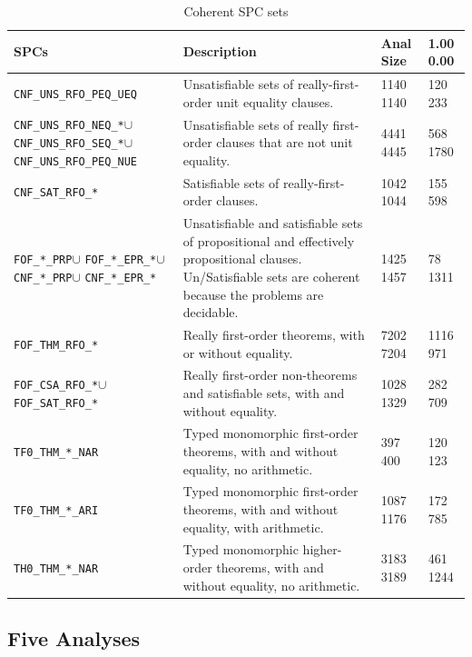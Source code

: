 \documentclass[runningheads]{llncs}
\begin{document}
\begin{table}[h!]
\renewcommand{\arraystretch}{1.5}
\center
\begin{tabular}{p{3.5cm}|p{6.5cm}|R{0.7cm}R{0.7cm}}
\hline
SPCs & Description & Anal Size & 1.00 0.00 \\
\hline
{\tt CNF\_UNS\_RFO\_PEQ\_UEQ} &
Unsatisfiable sets of really-first-order unit equality clauses.
& 1140 1140 & 120 233 \\
{\tt CNF\_UNS\_RFO\_NEQ\_*}\enspace$\cup$ {\tt CNF\_UNS\_RFO\_SEQ\_*}\enspace$\cup$
{\tt CNF\_UNS\_RFO\_PEQ\_NUE} &
Unsatisfiable sets of really first-order clauses that are not unit equality.
& 4441 4445 & 568 1780 \\
{\tt CNF\_SAT\_RFO\_*} &
Satisfiable sets of really-first-order clauses.
& 1042 1044 & 155 598 \\
{\tt FOF\_*\_PRP}\enspace$\cup$ {\tt FOF\_*\_EPR\_*}\enspace$\cup$
{\tt CNF\_*\_PRP}\enspace$\cup$ {\tt CNF\_*\_EPR\_*} &
Unsatisfiable and satisfiable sets of propositional and effectively propositional clauses.
Un/Satisfiable sets are coherent because the problems are decidable.
& 1425 1457 & 78 1311 \\
{\tt FOF\_THM\_RFO\_*} &
Really first-order theorems, with or without equality.
& 7202 7204 & 1116 971 \\
{\tt FOF\_CSA\_RFO\_*}\enspace$\cup$ {\tt FOF\_SAT\_RFO\_*} &
Really first-order non-theorems and satisfiable sets, with and without equality.
& 1028 1329 & 282 709 \\
{\tt TF0\_THM\_*\_NAR} &
Typed monomorphic first-order theorems, with and without equality, no arithmetic.
& 397 400 & 120 123 \\
{\tt TF0\_THM\_*\_ARI} &
Typed monomorphic first-order theorems, with and without equality, with arithmetic.
& 1087 1176 & 172 785 \\
{\tt TH0\_THM\_*\_NAR} &
Typed monomorphic higher-order theorems, with and without equality, no arithmetic.
& 3183 3189 & 461 1244 \\
\hline
\end{tabular}
\vspace*{0.5em}
\caption{Coherent SPC sets}
\label{SPCSetsTable}
\end{table}

\subsection{Five Analyses}
\label{AnalysisTypes}
\end{document}
